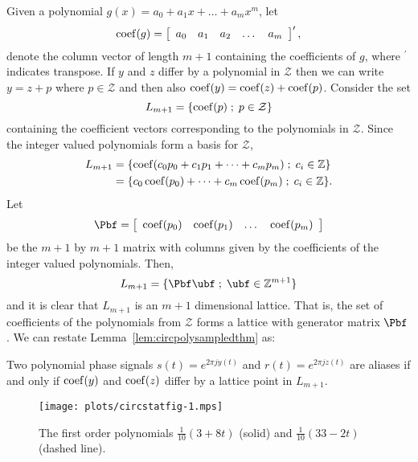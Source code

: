 \documentclass[journal]{IEEEtran}
\begin{document}
Given a polynomial $g(x) = a_0 + a_1x + \dots + a_m x^m$, let
\[
\operatorname{coef}(g) = \left[ \begin{array}{ccccc} a_0 & a_1 & a_2 & \dots & a_m \end{array} \right]^\prime,
\]
denote the column vector of length $m+1$ containing the coefficients of $g$, where $^\prime$ indicates transpose.  If $y$ and $z$ differ by a polynomial in $\mathcal{Z}$ then we can write $y = z + p$ where $p \in \mathcal{Z}$ and then also $\operatorname{coef}(y) = \operatorname{coef}(z) + \operatorname{coef}(p)$.
  Consider the set
\[
L_{m+1} = \{ \operatorname{coef}(p) \; ; \; p \in \mathcal{Z} \}
\]
containing the coefficient vectors corresponding to the polynomials in $\mathcal{Z}$.  Since the integer valued polynomials form a basis for $\mathcal{Z}$,
\begin{align*}
L_{m+1} &= \{ \operatorname{coef}(c_0 p_0 + c_1p_1 + \dots + c_mp_m) \; ; \; c_i \in {\mathbb Z} \} \\
&= \{ c_0 \operatorname{coef}(p_0) + \dots + c_m\operatorname{coef}(p_m) \; ; \; c_i \in {\mathbb Z} \}.
\end{align*}
Let
\[
\Pbf = \left[ \begin{array}{cccc} \coef(p_0)& \coef(p_1)& \dots& \coef(p_m)  \end{array} \right]
\]
be the $m+1$ by $m+1$ matrix with columns given by the coefficients of the integer valued polynomials.  Then,
\[
L_{m+1} = \{ \Pbf\ubf \mid \ubf \in \ints^{m+1} \}
\]
and it is clear that $L_{m+1}$ is an $m+1$ dimensional lattice.  That is, the set of coefficients of the polynomials from $\mathcal{Z}$ forms a lattice with generator matrix $\Pbf$. We can restate Lemma~\ref{lem:circpolysampledthm} as:
\begin{corollary}\label{cor:circpolysampledcoef}
Two polynomial phase signals $s(t) = e^{2\pi j y(t)}$  and $r(t) = e^{2\pi j z(t)}$ are aliases if and only if $\operatorname{coef}(y)$ and $\operatorname{coef}(z)$ differ by a lattice point in $L_{m+1}$.
\end{corollary}


\begin{figure}[t]
	\centering
		\texttt{[image: plots/circstatfig-1.mps]}
		\caption{The first order polynomials $\tfrac{1}{10}(3 + 8t)$ (solid) and $\tfrac{1}{10}(33 - 2t)$ (dashed line).}
		\label{fig:circstatplot_line}
\end{figure}
\end{document}
